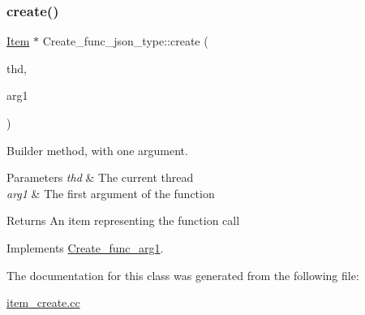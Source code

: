 \subsubsection{\texorpdfstring{create()}{create()}}
{\footnotesize\ttfamily \mbox{\hyperlink{classItem}{Item}} $\ast$ Create\+\_\+func\+\_\+json\+\_\+type\+::create (\begin{DoxyParamCaption}\item[{T\+HD $\ast$}]{thd,  }\item[{\mbox{\hyperlink{classItem}{Item}} $\ast$}]{arg1 }\end{DoxyParamCaption})\hspace{0.3cm}{\ttfamily [virtual]}}

Builder method, with one argument. 
\begin{DoxyParams}{Parameters}
{\em thd} & The current thread \\
\hline
{\em arg1} & The first argument of the function \\
\hline
\end{DoxyParams}
\begin{DoxyReturn}{Returns}
An item representing the function call 
\end{DoxyReturn}


Implements \mbox{\hyperlink{classCreate__func__arg1_a3e9a98f755cd82c3e762e334c955a8c9}{Create\+\_\+func\+\_\+arg1}}.



The documentation for this class was generated from the following file\+:\begin{DoxyCompactItemize}
\item 
\mbox{\hyperlink{item__create_8cc}{item\+\_\+create.\+cc}}\end{DoxyCompactItemize}
